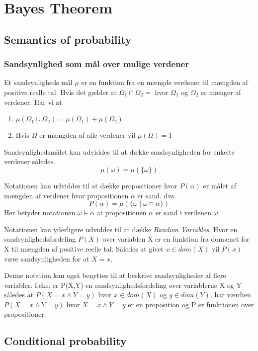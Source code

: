 \section{Bayes Theorem}


\subsection{Semantics of probability}

\subsubsection{Sandsynlighed som mål over mulige verdener}

Et sandsynligheds mål $\mu$ er en funktion fra en mængde verdener til mængden af positive reelle tal. 
Hvis det gælder at $\Omega_1 \cap \Omega_2 = {}$ hvor $\Omega_1$ og $\Omega_2$ er mænger af verdener.
Har vi at 
\begin{enumerate}
\item $\mu(\Omega_1 \cup \Omega_2) = \mu(\Omega_1) + \mu(\Omega_2)$
\item Hvis $\Omega$ er mængden af alle verdener vil $\mu(\Omega) = 1$ 
\end{enumerate}

Sandsynlighedsmålet kan udviddes til at dække sandsynligheden for enkelte verdener således.
$$\mu(\omega) = \mu(\{\omega\})$$

Notationen kan udviddes til at dække propositioner hvor $P(\alpha)$ er målet af mængden af verdener hvor
propositionen $\alpha$ er sand.
dvs.
$$P(\alpha) = \mu(\{\omega \mid \omega \models \alpha \})$$
Her betyder notationen $\omega \models \alpha$ at propositionen $\alpha$ er sand i verdenen $\omega$.

Notationen kan yderligere udviddes til at dække \emph{Random Variables}.
Hvor en sandsynlighedsfordeling $P(X)$ over variablen X er en funktion fra
domænet for X til mængden af positive reelle tal.
Således at givet $x \in dom(X)$ vil $P(x)$ være sandsynligheden for at $X = x$.

Denne notation kan også benyttes til at beskrive sandsynligheder af flere variabler.
f.eks. er P(X,Y) en sandsynlighedsfordeling over variablerne X og Y således at $P(X = x \wedge Y = y)$ hvor
$x \in dom(X)$ og $y \in dom(Y)$, har værdien $P(X = x \wedge Y = y)$ hvor
$X = x \wedge Y = y$ er en proposition og P er funktionen over propositioner. 

\subsection{Conditional probability}

